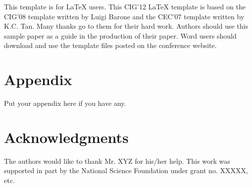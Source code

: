 \documentclass[conference]{IEEEtran}
\begin{document}
This template is for LaTeX users. This CIG'12 LaTeX template is
based on the CIG'08 template written by Luigi Barone and the CEC'07
template written by K.C. Tan. Many thanks go to them for their hard
work. Authors should use this sample paper as a guide in the
production of their paper. Word users should download and use the
template files posted on the conference website.

\section*{Appendix}
Put your appendix here if you have any.

\section*{Acknowledgments}
The authors would like to thank Mr. XYZ for his/her help.
This work was supported in part by the National Science Foundation
under grant no. XXXXX, etc.


%
%
%
%


\end{document}
